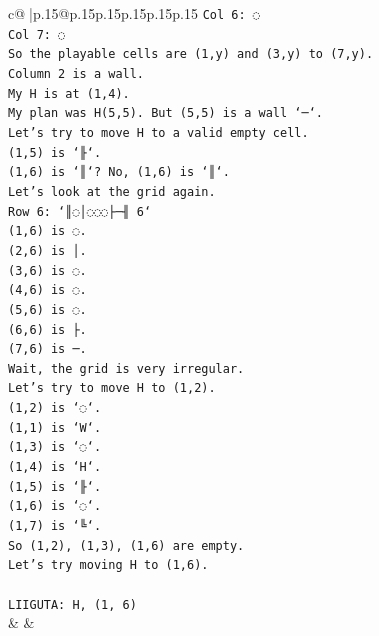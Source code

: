 \documentclass{article}
\begin{document}
{\begin{supertabular}{c@{$\;$}|p{.15\linewidth}@{}p{.15\linewidth}p{.15\linewidth}p{.15\linewidth}p{.15\linewidth}p{.15\linewidth}}
{{{\texttt{Col 6: ◌} \\
\texttt{Col 7: ◌} \\
\texttt{So the playable cells are (1,y) and (3,y) to (7,y).} \\
\texttt{Column 2 is a wall.} \\
\texttt{My H is at (1,4).} \\
\texttt{My plan was H(5,5). But (5,5) is a wall `─`.} \\
\texttt{Let's try to move H to a valid empty cell.} \\
\texttt{(1,5) is `╟`.} \\
\texttt{(1,6) is `║`? No, (1,6) is `║`.} \\
\texttt{Let's look at the grid again.} \\
\texttt{Row 6: `║◌│◌◌◌├─╢ 6`} \\
\texttt{(1,6) is ◌.} \\
\texttt{(2,6) is │.} \\
\texttt{(3,6) is ◌.} \\
\texttt{(4,6) is ◌.} \\
\texttt{(5,6) is ◌.} \\
\texttt{(6,6) is ├.} \\
\texttt{(7,6) is ─.} \\
\texttt{Wait, the grid is very irregular.} \\
\texttt{Let's try to move H to (1,2).} \\
\texttt{(1,2) is `◌`.} \\
\texttt{(1,1) is `W`.} \\
\texttt{(1,3) is `◌`.} \\
\texttt{(1,4) is `H`.} \\
\texttt{(1,5) is `╟`.} \\
\texttt{(1,6) is `◌`.} \\
\texttt{(1,7) is `╚`.} \\
\texttt{So (1,2), (1,3), (1,6) are empty.} \\
\texttt{Let's try moving H to (1,6).} \\
\\ 
\texttt{LIIGUTA: H, (1, 6)} \\
            }
        }
    }
    & & \\ \\


\end{supertabular}}
\end{document}
